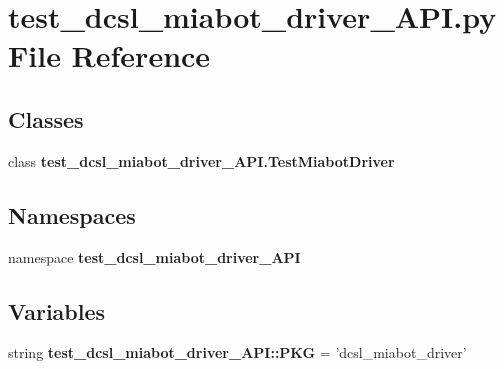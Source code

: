 \section{test\-\_\-dcsl\-\_\-miabot\-\_\-driver\-\_\-\-A\-P\-I.\-py \-File \-Reference}
\label{test__dcsl__miabot__driver__API_8py}
\subsection*{\-Classes}
\begin{DoxyCompactItemize}
\item 
class {\bf test\-\_\-dcsl\-\_\-miabot\-\_\-driver\-\_\-\-A\-P\-I.\-Test\-Miabot\-Driver}
\end{DoxyCompactItemize}
\subsection*{\-Namespaces}
\begin{DoxyCompactItemize}
\item 
namespace {\bf test\-\_\-dcsl\-\_\-miabot\-\_\-driver\-\_\-\-A\-P\-I}
\end{DoxyCompactItemize}
\subsection*{\-Variables}
\begin{DoxyCompactItemize}
\item 
string {\bf test\-\_\-dcsl\-\_\-miabot\-\_\-driver\-\_\-\-A\-P\-I\-::\-P\-K\-G} = 'dcsl\-\_\-miabot\-\_\-driver'
\end{DoxyCompactItemize}
